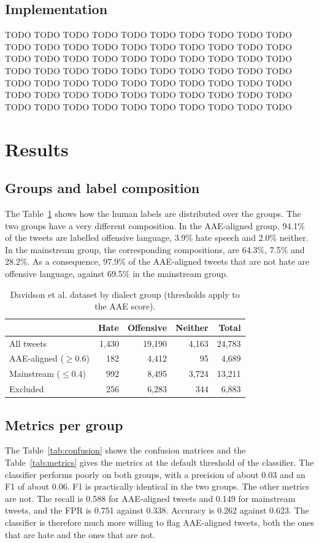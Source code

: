 \documentclass[runningheads,a4paper,oribibl]{llncs}
\begin{document}
\subsection{Implementation}
TODO TODO TODO TODO TODO TODO TODO TODO TODO TODO TODO TODO TODO TODO TODO TODO TODO TODO TODO TODO TODO TODO TODO TODO TODO TODO TODO TODO TODO TODO TODO TODO TODO TODO TODO TODO TODO TODO TODO TODO TODO TODO TODO TODO TODO TODO TODO TODO TODO TODO TODO TODO TODO TODO TODO TODO TODO TODO TODO TODO TODO TODO TODO TODO TODO TODO TODO TODO TODO TODO

\section{Results}\label{sec:results}
\subsection{Groups and label composition}
The Table~\ref{tab:groups} shows how the human labels are distributed over the groups. The two groups
have a very different composition. In the AAE-aligned group, 94.1\% of the tweets are labelled
offensive language, 3.9\% hate speech and 2.0\% neither. In the mainstream group, the corresponding compositions,
are 64.3\%, 7.5\% and 28.2\%. As a consequence, 97.9\% of the AAE-aligned tweets that are not hate are offensive language,
against 69.5\% in the mainstream group.

\begin{table}
   \centering
   \small
   \begin{tabular}{|l|r|r|r|r|}
     \hline
     & \textbf{Hate} & \textbf{Offensive} & \textbf{Neither} & \textbf{Total}\\
     \hline
     All tweets & 1,430 & 19,190 & 4,163 & 24,783\\
     AAE-aligned ($\geq 0.6$) & 182 & 4,412 & 95 & 4,689\\
     Mainstream ($\leq 0.4$) & 992 & 8,495 & 3,724 & 13,211\\
     Excluded & 256 & 6,283 & 344 & 6,883\\
     \hline
   \end{tabular}
   \caption{Davidson et al. dataset by dialect group (thresholds apply to the AAE score).\label{tab:groups}}
\end{table}

\subsection{Metrics per group}
The Table~\ref{tab:confusion} shows the confusion matrices and the Table~\ref{tab:metrics} gives the
metrics at the default threshold of the classifier. The classifier performs poorly on both groups,
with a precision of about 0.03 and an F1 of about 0.06. F1 is practically identical in the two groups.
The other metrics are not. The recall is 0.588 for AAE-aligned tweets and 0.149 for mainstream tweets,
and the FPR is 0.751 against 0.338. Accuracy is 0.262 against 0.623. The classifier is therefore much more
willing to flag AAE-aligned tweets, both the ones that are hate and the ones that are not.
\end{document}
